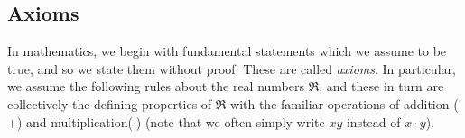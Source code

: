 \newpage

\subsection{Axioms}
In mathematics, we begin with fundamental statements which we
assume to be true, and so we state them without proof.  These
are called {\em axioms}.\footnotemark{}
In particular, we assume the following
rules about the real numbers $\Re$, and these in turn
are collectively the defining properties of $\Re$ 
with the familiar operations
of addition ($+$) and multiplication($\cdot$)
(note that we often simply write $xy$ instead of $x\cdot y$).
